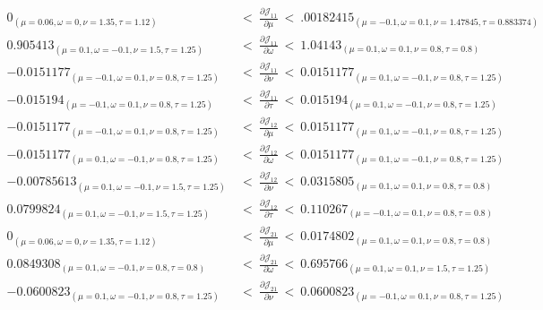 \documentclass{article}
\begin{document}
\begin{align}
0_ {(\mu = 0.06, \omega = 0, \nu = 1.35, \tau = 1.12)}\ &< \ \frac{\partial {\mathcal J}_{11}}{\partial \mu}  \ < \ .00182415_{(\mu = -0.1, \omega = 0.1, \nu = 1.47845, \tau = 0.883374)}\\ \nonumber
0.905413_{(\mu = 0.1, \omega = -0.1, \nu = 1.5, \tau = 1.25)}\ &< \  \frac{\partial {\mathcal J}_{11}}{\partial \omega}  \ < \ 1.04143_{(\mu = 0.1, \omega = 0.1, \nu = 0.8, \tau = 0.8)}\\ \nonumber
-0.0151177_{(\mu = -0.1, \omega = 0.1, \nu = 0.8, \tau = 1.25)}\ &< \  \frac{\partial {\mathcal J}_{11}}{\partial \nu}  \ < \ 0.0151177_{(\mu = 0.1, \omega = -0.1, \nu = 0.8, \tau = 1.25)}\\ \nonumber
-0.015194_{(\mu = -0.1, \omega = 0.1, \nu = 0.8, \tau = 1.25)}\ &< \  \frac{\partial {\mathcal J}_{11}}{\partial \tau}  \ < \ 0.015194_{(\mu = 0.1, \omega = -0.1, \nu = 0.8, \tau = 1.25)}\\ \nonumber
-0.0151177_{(\mu = -0.1, \omega = 0.1, \nu = 0.8, \tau = 1.25)}\ &< \  \frac{\partial {\mathcal J}_{12}}{\partial \mu}  \ < \ 0.0151177_{(\mu = 0.1, \omega = -0.1, \nu = 0.8, \tau = 1.25)}\\ \nonumber
-0.0151177_{(\mu = 0.1, \omega = -0.1, \nu = 0.8, \tau = 1.25)}\ &< \  \frac{\partial {\mathcal J}_{12}}{\partial \omega}  \ < \ 0.0151177_{(\mu = 0.1, \omega = -0.1, \nu = 0.8, \tau = 1.25)}\\ \nonumber
-0.00785613_{(\mu = 0.1, \omega = -0.1, \nu = 1.5, \tau = 1.25)}\ &< \  \frac{\partial {\mathcal J}_{12}}{\partial \nu}  \ < \ 0.0315805_{(\mu = 0.1, \omega = 0.1, \nu = 0.8, \tau = 0.8)}\\ \nonumber
0.0799824_{(\mu = 0.1, \omega = -0.1, \nu = 1.5, \tau = 1.25)}\ &< \ \frac{\partial {\mathcal J}_{12}}{\partial \tau}  \ < \ 0.110267_{(\mu = -0.1, \omega = 0.1, \nu = 0.8, \tau = 0.8)}\\ \nonumber
0_{(\mu = 0.06, \omega = 0, \nu = 1.35, \tau = 1.12)}\ &< \ \frac{\partial {\mathcal J}_{21}}{\partial \mu}  \ < \ 0.0174802_{(\mu = 0.1, \omega = 0.1, \nu = 0.8, \tau = 0.8)} \\ \nonumber
0.0849308_{(\mu = 0.1, \omega = -0.1, \nu = 0.8, \tau = 0.8)}\ &< \  \frac{\partial {\mathcal J}_{21}}{\partial \omega}  \ < \ 0.695766_{(\mu = 0.1, \omega = 0.1, \nu = 1.5, \tau = 1.25)}\\ \nonumber
-0.0600823_{(\mu = 0.1, \omega = -0.1, \nu = 0.8, \tau = 1.25)}\ &< \ \frac{\partial {\mathcal J}_{21}}{\partial \nu}  \ < \ 0.0600823_{(\mu = -0.1, \omega = 0.1, \nu = 0.8, \tau = 1.25)}\\ \nonumber

\end{align}
\end{document}
